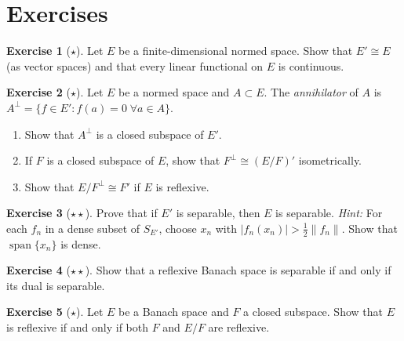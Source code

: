 \documentclass[a4paper,12pt]{book}
\DeclareMathOperator{\spn}{span}
\newcommand{\norm}[1]{\left\| #1 \right\|}
\theoremstyle{definition}
\newtheorem{exercise}{Exercise}[chapter]
\theoremstyle{plain}
\theoremstyle{remark}
\begin{document}
\section{Exercises}\label{sec:exercises-dual-reflexivity}

\begin{exercise}[$\star$]\label{exo:dual-finite-dim}
Let $E$ be a finite-dimensional normed space.  Show that $E'\cong E$ (as
vector spaces) and that every linear functional on $E$ is continuous.
\end{exercise}

\begin{exercise}[$\star$]\label{exo:annihilator}
Let $E$ be a normed space and $A\subset E$.  The \emph{annihilator} of $A$ is
$A^\perp = \{f\in E': f(a)=0\;\forall a\in A\}$.
\begin{enumerate}[label=(\alph*)]
  \item Show that $A^\perp$ is a closed subspace of $E'$.
  \item If $F$ is a closed subspace of $E$, show that $F^\perp\cong (E/F)'$
        isometrically.
  \item Show that $E/F^\perp \cong F'$ if $E$ is reflexive.
\end{enumerate}
\end{exercise}

\begin{exercise}[$\star\star$]\label{exo:separable-dual}
Prove that if $E'$ is separable, then $E$ is separable.
\textit{Hint:} For each $f_n$ in a dense subset of $S_{E'}$, choose $x_n$
with $|f_n(x_n)|>\frac{1}{2}\norm{f_n}$.  Show that $\spn\{x_n\}$ is dense.
\end{exercise}

\begin{exercise}[$\star\star$]\label{exo:reflexive-dual-separable}
Show that a reflexive Banach space is separable if and only if its dual is
separable.
\end{exercise}

\begin{exercise}[$\star$]\label{exo:subspace-quotient-reflexive}
Let $E$ be a Banach space and $F$ a closed subspace.  Show that $E$ is
reflexive if and only if both $F$ and $E/F$ are reflexive.
\end{exercise}
\end{document}
